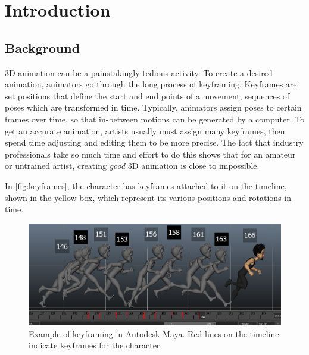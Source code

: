 \chapter{Introduction}\label{chap:intro}
\newcommand{\ignore}[1]{}
\ignore{Write this chapter LAST. Should be 5 to 10 pages. This chapter provides a quick summary of the
essential contents of the research project, principal results and contents of the report. The target
audience is members of the jury who do NOT have time to completely read all 21 reports, as well
academic members of other juries who wish to compare this work to other works.}

\section{Background}
\ignore{This is a generic title. Replace it with an actual title that describes the context of the work.
Short .5 page summary of the technological context of the work and why it is interesting or important}

3D animation can be a painstakingly tedious activity. To create a desired animation, animators go through the long process of keyframing. Keyframes are set positions that define the start and end points of a movement, sequences of poses which are transformed in time. Typically, animators assign poses to certain frames over time, so that in-between motions can be generated by a computer. To get an accurate animation, artists usually must assign many keyframes, then spend time adjusting and editing them to be more precise. The fact that industry professionals take so much time and effort to do this shows that for an amateur or untrained artist, creating \textit{good} 3D animation is close to impossible. 

In \autoref{fig:keyframes}, the character has keyframes attached to it on the timeline, shown in the yellow box, which represent its various positions and rotations in time.

\begin{figure}[h!]
\centering
\includegraphics[scale=0.7]{img/newrunningposes}
\caption{Example of keyframing in Autodesk Maya. Red lines on the timeline indicate keyframes for the character.}
\label{fig:keyframes}
\end{figure}

